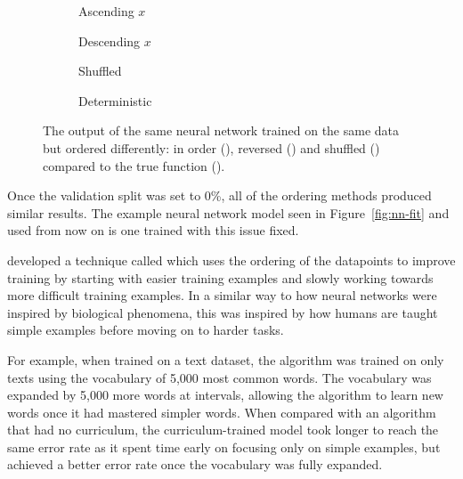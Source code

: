 \begin{figure}[htbp]
	\vspace*{-3cm}
    \centering
    \begin{subfigure}[b]{\figwidth}
		
        \caption{Ascending \(x\)}
        \label{fig:compare-order-ascending}
	\end{subfigure}
    \begin{subfigure}[b]{\figwidth}
		
        \caption{Descending \(x\)}
        \label{fig:compare-order-descending}
	\end{subfigure}
	\begin{subfigure}[b]{\figwidth}
		
        \caption{Shuffled}
        \label{fig:compare-order-shuffled}
	\end{subfigure}
	\begin{subfigure}[b]{\figwidth}
		
        \caption{Deterministic}
        \label{fig:compare-order-deterministic}
	\end{subfigure}
	\caption{The output of the same neural network trained on the same data but ordered differently: in order (\inordercolour), reversed (\reversedcolour) and shuffled (\shuffledcolour) compared to the true function (\truthcolour).}
	\label{fig:compare-order}
\end{figure}

Once the validation split was set to 0\%, all of the ordering methods produced similar results.
The example neural network model seen in Figure~\ref{fig:nn-fit} and used from now on is one trained with this issue fixed. 

\textcite{bengio2009} developed a technique called  which uses the ordering of the datapoints to improve training by starting with easier training examples and slowly working towards more difficult training examples.
In a similar way to how neural networks were inspired by biological phenomena, this was inspired by how humans are taught simple examples before moving on to harder tasks.

For example, when trained on a text dataset, the algorithm was trained on only texts using the vocabulary of 5,000 most common words.
The vocabulary was expanded by 5,000 more words at intervals, allowing the algorithm to learn new words once it had mastered simpler words.
When compared with an algorithm that had no curriculum, the curriculum-trained model took longer to reach the same error rate as it spent time early on focusing only on simple examples, but achieved a better error rate once the vocabulary was fully expanded.
